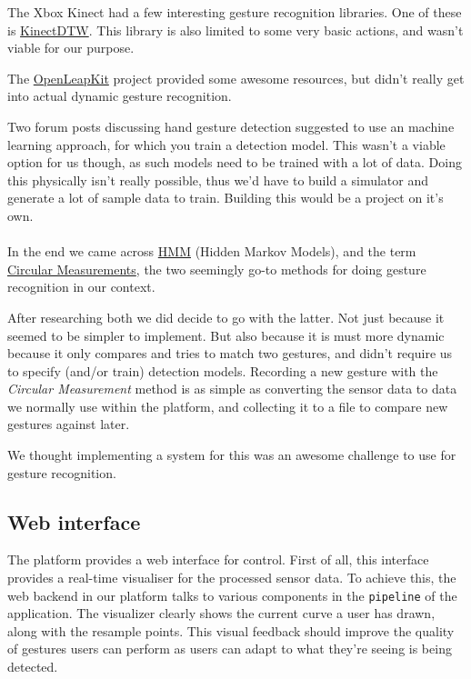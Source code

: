 \documentclass{standalone}
\begin{document}
  The Xbox Kinect had a few interesting gesture recognition libraries. One of
  these is \href{https://archive.codeplex.com/?p=kinectdtw}{KinectDTW}. This
  library is also limited to some very basic actions, and wasn't viable for our
  purpose.

  The
  \href{https://forums.leapmotion.com/t/openleapkit-updated-leap-motion-controller-toolkit-for-common-needs/289}{OpenLeapKit}
  project provided some awesome resources, but didn't really get into actual
  dynamic gesture recognition.

  Two forum posts discussing hand gesture detection suggested to use an machine
  learning approach, for which you train a detection model. This wasn't a viable
  option for us though, as such models need to be trained with a lot of data.
  Doing this physically isn't really possible, thus we'd have to build a
  simulator and generate a lot of sample data to train. Building this would be a
  project on it's own.

  \paragraph{}
  In the end we came across
  \href{http://www.creativedistraction.com/demos/gesture-recognition-kinect-with-hidden-markov-models-hmms/}{HMM}
  (Hidden Markov Models), and the term
  \href{http://delivery.acm.org/10.1145/3140000/3134139/p12-balcazar.pdf}{Circular
  Measurements}, the two seemingly go-to methods for doing gesture recognition
  in our context.

  After researching both we did decide to go with the latter.
  Not just because it seemed to be simpler to implement. But also because it is
  must more dynamic because it only compares and tries to match two gestures,
  and didn't require us to specify (and/or train) detection models.
  Recording a new gesture with the \emph{Circular Measurement} method is as
  simple as converting the sensor data to data we normally use within the
  platform, and collecting it to a file to compare new gestures against later.

  We thought implementing a system for this was an awesome challenge to use for
  gesture recognition.

  \subsection{Web interface}
  The platform provides a web interface for control. First of all, this
  interface provides a real-time visualiser for the processed sensor data. To
  achieve this, the web backend in our platform talks to various components in
  the \verb_pipeline_ of the application. The visualizer clearly shows the
  current curve a user has drawn, along with the resample points. This visual
  feedback should improve the quality of gestures users can perform as users
  can adapt to what they're seeing is being detected.
\end{document}
